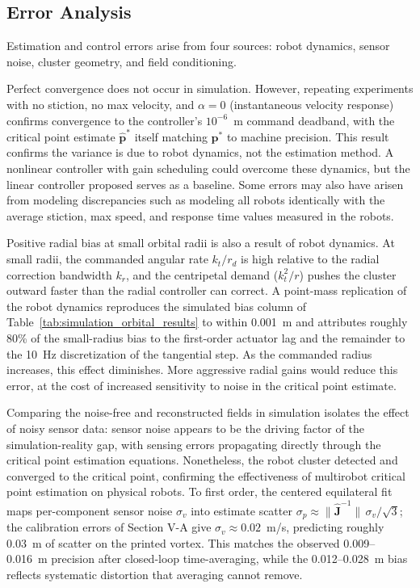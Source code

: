 \documentclass[lettersize,journal]{IEEEtran}
\begin{document}
\subsection{Error Analysis}

Estimation and control errors arise from four sources: robot dynamics, sensor noise, cluster geometry, and field conditioning.

Perfect convergence does not occur in simulation. However, repeating experiments with no stiction, no max velocity, and $\alpha = 0$ (instantaneous velocity response) confirms convergence to the controller's $10^{-6}$~m command deadband, with the critical point estimate $\hat{\mathbf{p}}^*$ itself matching $\mathbf{p}^*$ to machine precision. This result confirms the variance is due to robot dynamics, not the estimation method. A nonlinear controller with gain scheduling could overcome these dynamics, but the linear controller proposed serves as a baseline. Some errors may also have arisen from modeling discrepancies such as modeling all robots identically with the average stiction, max speed, and response time values measured in the robots.

Positive radial bias at small orbital radii is also a result of robot dynamics. At small radii, the commanded angular rate $k_t / r_d$ is high relative to the radial correction bandwidth $k_r$, and the centripetal demand ($k_t^2 / r$) pushes the cluster outward faster than the radial controller can correct. A point-mass replication of the robot dynamics reproduces the simulated bias column of Table~\ref{tab:simulation_orbital_results} to within 0.001~m and attributes roughly 80\% of the small-radius bias to the first-order actuator lag and the remainder to the 10~Hz discretization of the tangential step. As the commanded radius increases, this effect diminishes. More aggressive radial gains would reduce this error, at the cost of increased sensitivity to noise in the critical point estimate.

Comparing the noise-free and reconstructed fields in simulation isolates the effect of noisy sensor data: sensor noise appears to be the driving factor of the simulation-reality gap, with sensing errors propagating directly through the critical point estimation equations. Nonetheless, the robot cluster detected and converged to the critical point, confirming the effectiveness of multirobot critical point estimation on physical robots. To first order, the centered equilateral fit maps per-component sensor noise $\sigma_v$ into estimate scatter $\sigma_p \approx \|\hat{\mathbf{J}}^{-1}\|\,\sigma_v/\sqrt{3}$; the calibration errors of Section V-A give $\sigma_v \approx 0.02$~m/s, predicting roughly 0.03~m of scatter on the printed vortex. This matches the observed 0.009--0.016~m precision after closed-loop time-averaging, while the 0.012--0.028~m bias reflects systematic distortion that averaging cannot remove.
\end{document}
